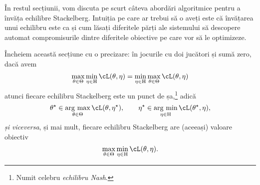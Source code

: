 \documentclass[../../book-main_ro.tex]{subfiles}
\begin{document}
În restul secțiunii, vom discuta pe scurt câteva abordări algoritmice pentru a învăța echilibre Stackelberg. Intuiția pe care ar trebui să o aveți este că învățarea unui echilibru este ca și cum lăsați diferitele părți ale sistemului să descopere automat compromisurile dintre diferitele obiective pe care vor să le optimizeze. 

Încheiem această secțiune cu o precizare: în jocurile cu doi jucători și sumă zero, dacă avem
\begin{equation}
    \max_{\theta \in \Theta}\min_{\eta \in \Eta}\cL(\theta, \eta) = \min_{\eta \in \Eta}\max_{\theta \in \Theta}\cL(\theta, \eta)
\end{equation}
atunci fiecare echilibru Stackelberg este un punct de șa,\footnote{Numit celebru \textit{echilibru Nash}.} adică 
\begin{equation}
    \theta^{\star} \in \argmax_{\theta \in \Theta}\cL(\theta, \eta^{\star}), \qquad \eta^{\star} \in \argmin_{\eta \in \Eta}\cL(\theta^{\star}, \eta),
\end{equation}
\textit{și viceversa}, și mai mult, fiecare echilibru Stackelberg are (aceeași) valoare obiectiv \[\max_{\theta \in \Theta}\min_{\eta \in \Eta}\cL(\theta, \eta).\]
\end{document}

